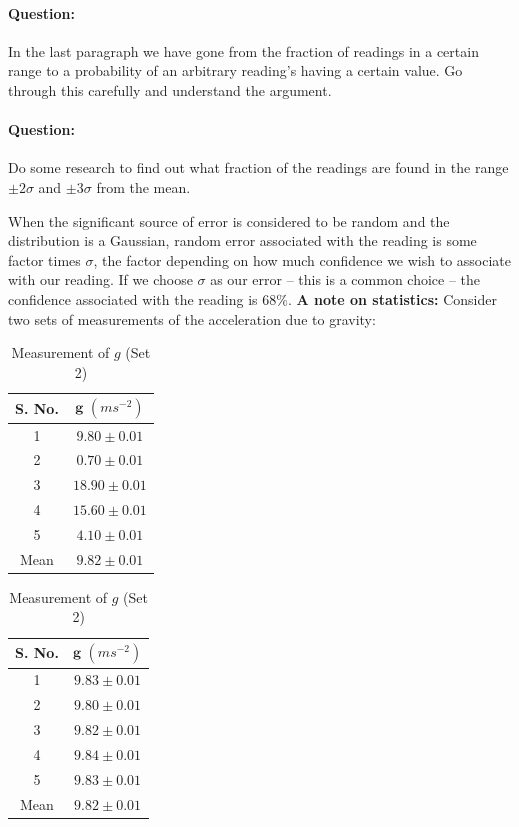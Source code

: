 \begin{question}
    \paragraph{Question:} In the last paragraph we have gone from the fraction of readings in a certain range to a probability of an arbitrary reading's having a certain value. Go through this carefully and understand the argument.

    \paragraph{Question:} Do some research to find out what fraction of the readings are found in the range $\pm 2\sigma$ and $\pm 3 \sigma$ from the mean. 
\end{question}

When the significant source of error is considered to be random and the distribution is a Gaussian, random error associated with the reading is some factor times $\sigma$, the factor depending on how much confidence we wish to associate with our reading. If we choose $\sigma$ as our error -- this is a common choice -- the confidence associated with the reading is $68 \%$. 
\newpage
\textbf{A note on statistics:} Consider two sets of measurements of the acceleration due to gravity:

\begin{table}[!htb]
\parbox{.45\linewidth}{
\centering
\begin{tabular}{cc}
\hline
\textbf{S. No.}&$\bm{g}\,\, (ms^{-2})$\\
\hline
1&$9.80\pm0.01$\\
2&$0.70\pm0.01$\\
3&$18.90\pm0.01$\\
4&$15.60\pm0.01$\\
5&$4.10\pm0.01$\\
\hline
Mean&$9.82\pm0.01$\\
\hline
\end{tabular}
\caption{Measurement of $g$ (Set 1)}
}
\hfill
\parbox{.45\linewidth}{
\centering
\begin{tabular}{cc}
\hline
\textbf{S. No.}&$\bm{g}\,\, (ms^{-2})$\\
\hline
1&$9.83\pm0.01$\\
2&$9.80\pm0.01$\\
3&$9.82\pm0.01$\\
4&$9.84\pm0.01$\\
5&$9.83\pm0.01$\\
\hline
Mean&$9.82\pm0.01$\\
\hline
\end{tabular}
\caption{Measurement of $g$ (Set 2)}
}
\end{table}

